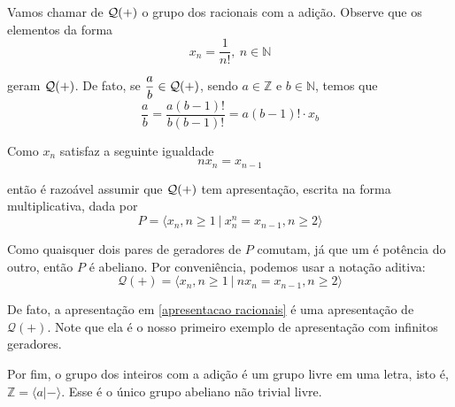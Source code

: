 \documentclass[a4paper,portuguese,11pt,twoside, leqno]{book}
\theoremstyle{definition}
\newtheorem{example}{Exemplo}[section]
\begin{document}
	
	
	
	\par\vspace{0.3cm} Vamos chamar de $\cal{Q}(+)$ o grupo dos racionais com a adição. Observe que os elementos da forma
	\begin{equation*}
	x_n = \frac{1}{n!}, \ n\in\mathbb{N}
	\end{equation*}
	\par\vspace{0.3cm} geram $\cal{Q}(+)$. De fato, se $\displaystyle{ \frac{a}{b}\in\cal{Q}(+) }$, sendo $a\in\mathbb{Z}$ e $b\in\mathbb{N}$, temos que
	\begin{equation*}
	\frac{a}{b} = \frac{a(b-1)!}{b(b-1)!} = a(b-1)!\cdot x_b
	\end{equation*}
	\par\vspace{0.3cm} Como $x_n$ satisfaz a seguinte igualdade
	\begin{equation*}
	nx_n = x_{n-1}
	\end{equation*}
	\par\vspace{0.3cm} então é razoável assumir que $\cal{Q}(+)$ tem apresentação, escrita na forma multiplicativa, dada por
	\begin{equation*}
	P = \langle x_n, n\geq 1 \ | \ x_n^n = x_{n-1}, n\geq 2 \rangle
	\end{equation*}
	\par\vspace{0.3cm} Como quaisquer dois pares de geradores de $P$ comutam, já que um é potência do outro, então $P$ é abeliano. Por conveniência, podemos usar a notação aditiva:
	\begin{equation}
	\mathcal{Q}(+) = \langle x_n, n\geq 1 \ | \ nx_n = x_{n-1}, n\geq 2 \rangle
	\label{apresentacao racionais}
	\end{equation}
	\par\vspace{0.3cm} De fato, a apresentação em \eqref{apresentacao racionais} é uma apresentação de $\mathcal{Q}(+)$. Note que ela é o nosso primeiro exemplo de apresentação com infinitos geradores.
	\par\vspace{0.3cm} Por fim, o grupo dos inteiros com a adição é um grupo livre em uma letra, isto é, $\mathbb{Z} = \langle a|- \rangle$. Esse é o único grupo abeliano não trivial livre.
	
\end{document}

